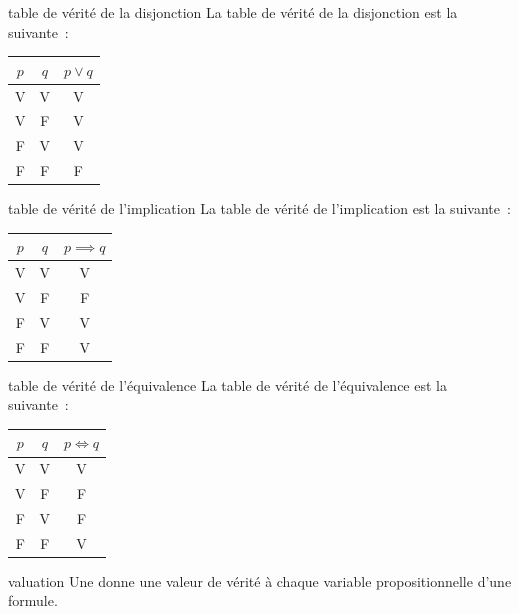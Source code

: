 \begin{proposition}{}{table de vérité de la disjonction}
    La table de vérité de la disjonction est la suivante~:
    \begin{center}
        \begin{tabular}{c|c|c}
            $p$ & $q$ & $p \lor q$ \\
            \hline
            V & V & V \\
            V & F & V \\
            F & V & V \\
            F & F & F \\
        \end{tabular}
    \end{center}
\end{proposition}

\begin{proposition}{}{table de vérité de l'implication}
    La table de vérité de l'implication est la suivante~:
    \begin{center}
        \begin{tabular}{c|c|c}
            $p$ & $q$ & $p \implies q$ \\
            \hline
            V & V & V \\
            V & F & F \\
            F & V & V \\
            F & F & V \\
        \end{tabular}
    \end{center}
\end{proposition}

\begin{proposition}{}{table de vérité de l'équivalence}
    La table de vérité de l'équivalence est la suivante~:
    \begin{center}
        \begin{tabular}{c|c|c}
            $p$ & $q$ & $p \iff q$ \\
            \hline
            V & V & V \\
            V & F & F \\
            F & V & F \\
            F & F & V \\
        \end{tabular}
    \end{center}
\end{proposition}
    

\begin{definition}{}{valuation}
    Une  donne une valeur de vérité à chaque variable propositionnelle d'une formule.
\end{definition}

